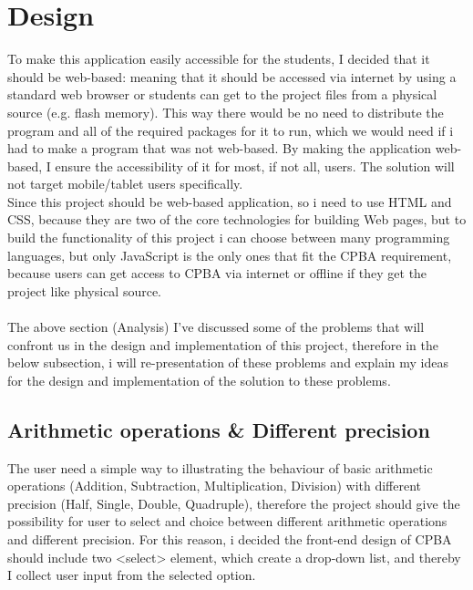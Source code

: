 \documentclass[11pt]{article}
\begin{document}
\section{Design}
To make this application easily accessible for the students, I decided that it should be web-based: meaning that it should be accessed via internet by using a standard web browser or students can get to the project files from  a physical source (e.g. flash memory). This way there would be no need to distribute the program and all of the required packages for it to run, which we would need if i had to make a program that was not web-based. By making the application web-based, I ensure the accessibility of it for most, if not all, users.
The solution will not target mobile/tablet users specifically.\\

Since this project should be web-based application, so i need to use HTML and CSS, because they are two of the core technologies for building Web pages, but to build the functionality of this project i can choose between many programming languages, but only JavaScript is the only ones that fit the CPBA requirement, because users can get access to CPBA via internet or offline if they get the project like physical source.\\\\
The above section (Analysis) I’ve discussed some of the problems that will confront us in the design and implementation of this project, therefore in the below subsection, i will re-presentation of these problems and explain my ideas for the design and implementation of the solution to these problems.\\
\subsection{Arithmetic operations \& Different precision}
The user need a simple way to illustrating the behaviour of basic arithmetic operations (Addition, Subtraction, Multiplication, Division) with different precision (Half, Single, Double, Quadruple), therefore the project should give the possibility for user to select and choice between different arithmetic operations and different precision. For this reason, i decided the front-end design of CPBA should include  two  <select> element, which create a drop-down list, and thereby I collect user input from the selected option.
\end{document}
